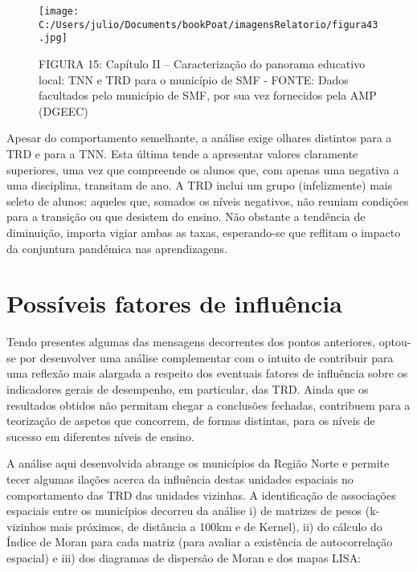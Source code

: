 \documentclass[
]{book}
\begin{document}
\begin{figure}
\centering
\texttt{[image: C:/Users/julio/Documents/bookPoat/imagensRelatorio/figura43.jpg]}
\caption{FIGURA 15: Capítulo II -- Caracterização do panorama educativo local: TNN e TRD para o município de SMF - FONTE: Dados facultados pelo município de SMF, por sua vez fornecidos pela AMP (DGEEC)}
\end{figure}

Apesar do comportamento semelhante, a análise exige olhares distintos para a TRD e para a TNN. Esta última tende a apresentar valores claramente superiores, uma vez que compreende os alunos que, com apenas uma negativa a uma disciplina, transitam de ano. A TRD inclui um grupo (infelizmente) mais seleto de alunos: aqueles que, somados os níveis negativos, não reuniam condições para a transição ou que desistem do ensino. Não obstante a tendência de diminuição, importa vigiar ambas as taxas, esperando-se que reflitam o impacto da conjuntura pandémica nas aprendizagens.

\hypertarget{possuxedveis-fatores-de-influuxeancia}{%
\section{\texorpdfstring{\textbf{Possíveis fatores de influência}}{Possíveis fatores de influência}}\label{possuxedveis-fatores-de-influuxeancia}}

Tendo presentes algumas das mensagens decorrentes dos pontos anteriores, optou-se por desenvolver uma análise complementar com o intuito de contribuir para uma reflexão mais alargada a respeito dos eventuais fatores de influência sobre os indicadores gerais de desempenho, em particular, das TRD. Ainda que os resultados obtidos não permitam chegar a conclusões fechadas, contribuem para a teorização de aspetos que concorrem, de formas distintas, para os níveis de sucesso em diferentes níveis de ensino.

A análise aqui desenvolvida abrange os municípios da Região Norte e permite tecer algumas ilações acerca da influência destas unidades espaciais no comportamento das TRD das unidades vizinhas. A identificação de associações espaciais entre os municípios decorreu da análise i) de matrizes de pesos (k-vizinhos mais próximos, de distância a 100km e de Kernel), ii) do cálculo do Índice de Moran para cada matriz (para avaliar a existência de autocorrelação espacial) e iii) dos diagramas de dispersão de Moran e dos mapas LISA:
\end{document}
